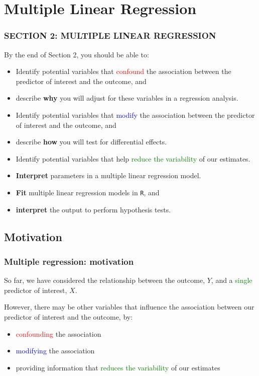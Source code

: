 \documentclass[12pt, 
hyperref={colorlinks=true, linkcolor=blue, urlcolor=cyan}]{beamer}
\begin{document}
\section{Multiple Linear Regression}
\begin{frame}
\frametitle{SECTION 2: MULTIPLE LINEAR REGRESSION}
By the end of Section 2, you should be able to: \vspace{-0.4cm}
\begin{itemize}
\item Identify potential variables that \textcolor{red}{confound} the association between the predictor of interest and the outcome, and
\item describe \textbf{why} you will adjust for these variables in a regression analysis.
\item Identify potential variables that \textcolor{blue}{modify} the association between the predictor of interest and the outcome, and  
\item describe \textbf{how} you will test for  differential effects.
\item Identify potential variables that help \textcolor{green}{reduce the variability} of our estimates.
\item \textbf{Interpret} parameters in a multiple linear regression model.
\item \textbf{Fit} multiple linear regression models in \texttt{R}, and
\item \textbf{interpret} the output to perform hypothesis tests.
\end{itemize}

\end{frame}

\subsection{Motivation}
\begin{frame}
\frametitle{Multiple regression: motivation}

So far, we have considered the relationship between the outcome, $Y$, and a \textcolor{green}{single} predictor of interest, $X$.

However, there may be other variables that influence the association between our predictor of interest and the outcome, by:
\begin{itemize}
\item \textcolor{red}{confounding} the association 
\item \textcolor{blue}{modifying} the association
\item providing information that \textcolor{green}{reduces the variability} of our estimates
\end{itemize} 
\end{frame}
\end{document}
